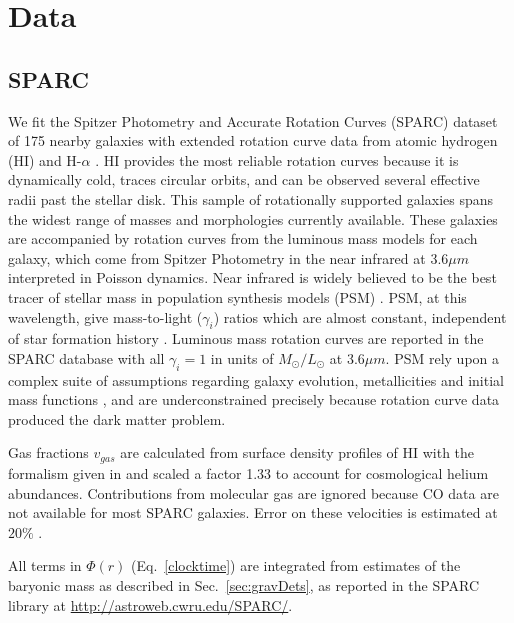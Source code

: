 \documentclass[reprint,%
 amsmath,amssymb,
 aps,
]{revtex4-1}
\begin{document}
      
    

\section{Data \label{sec:data}}
 
 \subsection{SPARC }
 We fit the Spitzer Photometry and Accurate Rotation Curves (SPARC) dataset  of  175 nearby galaxies with extended rotation curve data from atomic hydrogen (HI)  and H-$\alpha$ \cite{2016Lelli}. 
 HI provides the most reliable
 rotation curves because it is dynamically cold, traces circular orbits, and can be observed several effective radii past the stellar disk. 
 This sample of rotationally supported galaxies   spans the widest range of masses and morphologies currently available. 
These galaxies are  accompanied by rotation curves from the  luminous mass models for each galaxy, which come from   Spitzer Photometry in the 
   near infrared  at 3.6$\mu m$ interpreted in Poisson dynamics. 
   Near infrared  is  widely believed to be the best tracer of stellar mass   in population synthesis models (PSM) \cite{10.1093/mnras/sty3223}.  PSM, at this wavelength,   give mass-to-light ($\gamma_i$) ratios which are almost constant, independent of star formation history \cite{BelldYong,10.1093/mnras/sty3223}. Luminous mass rotation curves are reported in the SPARC database with all $\gamma_i=1$ in units of $M_{\odot} / L_{\odot}$   at 3.6$\mu m$. 
   PSM rely upon a complex  suite of  assumptions regarding galaxy evolution, metallicities and initial mass functions  \cite{BelldYong,10.1093/mnras/sty3223}, and are underconstrained precisely because rotation curve data produced the dark matter problem.   
   
     Gas fractions $v_{gas}$ are calculated from surface density profiles of HI  with the formalism given in  \cite{1983MNRAS.203..735C} and scaled 
     a factor 1.33 to account for cosmological helium abundances.  Contributions from molecular gas are ignored   because CO data are not available for most SPARC galaxies. 
     Error on these velocities is estimated at $20\%$ \cite{2016Lelli}. 

   
   
     All terms in $\Phi(r)$ (Eq.~\ref{clocktime})  are    integrated from estimates of the baryonic mass as described in Sec.~\ref{sec:gravDets}, as reported  in the      SPARC  library at \url{http://astroweb.cwru.edu/SPARC/}.    
\end{document}
